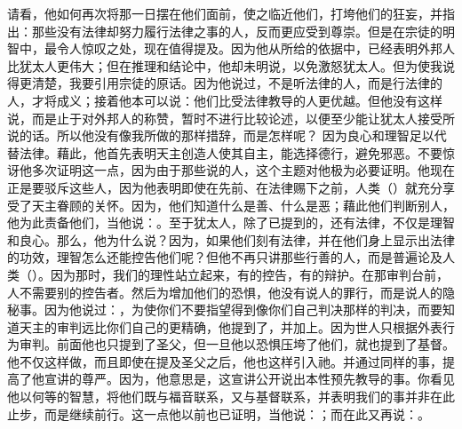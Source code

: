 请看，他如何再次将那一日摆在他们面前，使之临近他们，打垮他们的狂妄，并指出：那些没有法律却努力履行法律之事的人，反而更应受到尊崇。但是在宗徒的明智中，最令人惊叹之处，现在值得提及。因为他从所给的依据中，已经表明外邦人比犹太人更伟大；但在推理和结论中，他却未明说，以免激怒犹太人。但为使我说得更清楚，我要引用宗徒的原话。因为他说过，不是听法律的人，而是行法律的人，才将成义；接着他本可以说：他们比受法律教导的人更优越。但他没有这样说，而是止于对外邦人的称赞，暂时不进行比较论述，以便至少能让犹太人接受所说的话。所以他没有像我所做的那样措辞，而是怎样呢？ 因为良心和理智足以代替法律。藉此，他首先表明天主创造人使其自主，能选择德行，避免邪恶。不要惊讶他多次证明这一点，因为由于那些说的人，这个主题对他极为必要证明。他现在正是要驳斥这些人，因为他表明即使在先前、在法律赐下之前，人类（）就充分享受了天主眷顾的关怀。因为，他们知道什么是善、什么是恶；藉此他们判断别人，他为此责备他们，当他说：。至于犹太人，除了已提到的，还有法律，不仅是理智和良心。那么，他为什么说？因为，如果他们刻有法律，并在他们身上显示出法律的功效，理智怎么还能控告他们呢？但他不再只讲那些行善的人，而是普遍论及人类（）。因为那时，我们的理性站立起来，有的控告，有的辩护。在那审判台前，人不需要别的控告者。然后为增加他们的恐惧，他没有说人的罪行，而是说人的隐秘事。因为他说过：，为使你们不要指望得到像你们自己判决那样的判决，而要知道天主的审判远比你们自己的更精确，他提到了，并加上。因为世人只根据外表行为审判。前面他也只提到了圣父，但一旦他以恐惧压垮了他们，就也提到了基督。他不仅这样做，而且即使在提及圣父之后，他也这样引入祂。并通过同样的事，提高了他宣讲的尊严。因为，他意思是，这宣讲公开说出本性预先教导的事。你看见他以何等的智慧，将他们既与福音联系，又与基督联系，并表明我们的事并非在此止步，而是继续前行。这一点他以前也已证明，当他说：；而在此又再说：。\par

